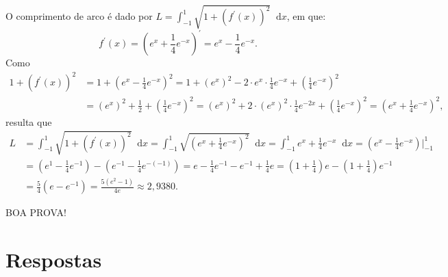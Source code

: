 \documentclass[12pt,a4paper]{article}
\newcommand*\diff{\mathop{}\!\mathrm{d}}
\begin{document}
\begin{ExerciseList}
O comprimento de arco é dado por $L = \int_{-1}^1 \sqrt{1 + \left(f^\prime(x)\right)^2} \diff{x}$, em que:
\[
  f^\prime(x)
  = \left(e^x + \frac{1}{4} e^{-x}\right)^\prime
  = e^x - \frac{1}{4} e^{-x}.
\]
Como
\begin{align*}
  1 + \left(f^\prime(x)\right)^2
  & = 1 + \left(e^x - \frac{1}{4} e^{-x}\right)^2
    = 1 + (e^{x})^2 - 2 \cdot e^x \cdot \frac{1}{4} e^{-x} + \left(\frac{1}{4}e^{-x}\right)^2 \\
  & = (e^{x})^2 + \frac{1}{2} + \left(\frac{1}{4}e^{-x}\right)^2
    = (e^{x})^2 + 2 \cdot (e^{x})^2\cdot \frac{1}{4} e^{-2x} + \left(\frac{1}{4}e^{-x}\right)^2
    = \left(e^{x} + \frac{1}{4}e^{-x} \right)^2,
\end{align*}
resulta que
\begin{align*}
  L
  & = \int_{-1}^1 \sqrt{1 + \left(f^\prime(x)\right)^2} \diff{x}
    = \int_{-1}^1 \sqrt{\left(e^{x} + \frac{1}{4}e^{-x} \right)^2} \diff{x}
    = \int_{-1}^1 e^{x} + \frac{1}{4}e^{-x} \diff{x}
    = \left(e^{x} - \frac{1}{4}e^{-x}\right)\bigg\rvert_{-1}^1 \\
  & = \left(e^{1} - \frac{1}{4}e^{-1}\right) - \left(e^{-1} - \frac{1}{4}e^{-(-1)}\right)
    = e - \frac{1}{4}e^{-1} - e^{-1} + \frac{1}{4}e
    = \left(1+\frac{1}{4}\right)e - \left(1+\frac{1}{4}\right)e^{-1}\\
  & = \frac{5}{4}(e - e^{-1})
    = \frac{5 (e^2 - 1)}{4 e}
    \approx 2,9380.
\end{align*}
\end{ExerciseList}

\begin{center}
BOA PROVA!
\end{center}

\newpage
\restoregeometry
\section*{Respostas}
\shipoutAnswer
\end{document}

